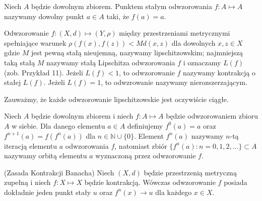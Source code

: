 \documentclass[leqno]{article}
\begin{document}
\begin{justify}
\begin{defn}
    Niech $A$ będzie dowolnym zbiorem. Punktem stałym odwzorowania $f : A \mapsto A$ nazywamy dowolny punkt $a \in A$ taki, że $f(a) = a$.
\end{defn}

\begin{defn}
    Odwzorowanie $f : (X, d) \mapsto (Y, \rho)$ między przestrzeniami metrycznymi spełniające warunek 
    $\rho(f(x), f(z)) < Md(x, z)$ dla dowolnych $x, z \in X$ gdzie $M$ jest pewną stałą nieujemną, nazywamy lipschitzowskim;
    najmniejszą taką stałą $M$ nazywamy stałą Lipschitza odwzorowania $f$ i oznaczamy $L(f)$ (zob. Przykład 11).
    Jeżeli $L(f) < 1$, to odwzorowanie $f$  nazywamy kontrakcją o stałej $L(f)$. Jeżeli $L(f) = 1$, to odwzrowanie nazywamy nierozszerzającym. 
\end{defn}

Zauważmy, że każde odwzorowanie lipschitzowskie jest oczywiście ciągłe. 

\begin{defn}
    Niech $A$ będzie dowolnym zbiorem i niech $f : A \mapsto A$ będzie odwzorowaniem zbioru $A$ w siebie.
    Dla danego elementu $a \in A$ definiujemy $f^0(a) = a$ oraz $f^{n+1}(a) = f(f^n(a))$ dla $n \in \mathbb{N} \cup \{0\}$.
    Element $f^n(a)$ nazywamy $n$-tą iteracją elementu $a$ odwzorowania $f$, natomiast zbiór $\{f^n(a) : n = 0,1,2,\ldots\} \subset A$
    nazywamy orbitą elementu $a$ wyznaczoną przez odwzorowanie $f$. 
\end{defn}

\begin{theorem}
{
    (Zasada Kontrakcji Banacha) Niech $(X, d)$ będzie przestrzenią metryczną zupełną i niech $f : X \mapsto X$ będzie kontrakcją.
    Wówczas odwzorowanie $f$ posiada dokładnie jeden punkt stały $u$ oraz $f^n(x) \to u$ dla każdego $x \in X$. 
}
\end{theorem}


\end{justify}
\end{document}
